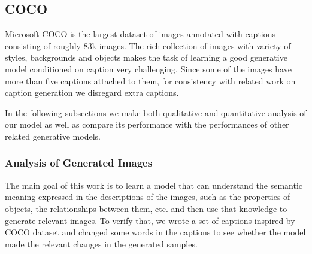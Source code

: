 \documentclass{article} %
\begin{document}


\subsection{COCO}

Microsoft COCO \citep{mscoco} is the largest dataset of images annotated with captions consisting of roughly 83k images. The rich collection of images with variety of styles, backgrounds and objects makes the task of learning a good generative model conditioned on caption very challenging. Since some of the images have more than five captions attached to them, for consistency with related work on caption generation we disregard extra captions.

In the following subsections we make both qualitative and quantitative analysis of our model as well as compare its performance with the performances of other related generative models.

\subsubsection{Analysis of Generated Images}
The main goal of this work is to learn a model that can understand the semantic meaning expressed in the descriptions of the images, such as the properties of objects, the relationships between them, etc. and then use that knowledge to generate relevant images. To verify that, we wrote a set of captions inspired by COCO dataset and changed some words in the captions to see whether the model made the relevant changes in the generated samples.
\end{document}
